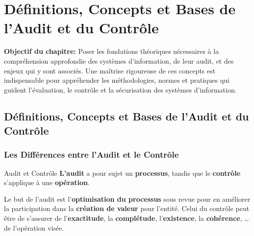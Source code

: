 

\chapter{Définitions, Concepts et Bases de l'Audit et du Contrôle}%
\label{chap:02_fondamentaux}

\begin{boxobjectifs}
\textbf{Objectif du chapitre:} Poser les fondations théoriques nécessaires à la
compréhension approfondie des systèmes d'information, de leur audit, et des enjeux
qui y sont associés. Une maîtrise rigoureuse de ces concepts est indispensable pour
appréhender les méthodologies, normes et pratiques qui guident l'évaluation, le
contrôle et la sécurisation des systèmes d'information.
\end{boxobjectifs}

\section{Définitions, Concepts et Bases de l'Audit et du Contrôle}

\subsection{Les Différences entre l'Audit et le Contrôle}

\begin{boxdef}{Audit et Contrôle}
\textbf{L'audit} a pour sujet un \textbf{processus}, tandis que le \textbf{contrôle}
s'applique à une \textbf{opération}.

Le but de l'audit est l'\textbf{optimisation du processus} sous revue pour en améliorer
la participation dans la \textbf{création de valeur} pour l'entité. Celui du contrôle
peut être de s'assurer de l'\textbf{exactitude}, la \textbf{complétude},
l'\textbf{existence}, la \textbf{cohérence}, \dots de l'opération visée.
\end{boxdef}


